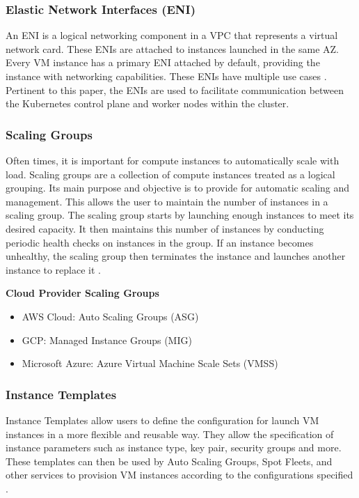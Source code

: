\subsubsection{Elastic Network Interfaces (ENI)}
An ENI is a logical networking component in a VPC that represents a virtual network card. These ENIs are attached to instances launched in the same AZ. Every VM instance has a primary ENI attached by default, providing the instance with networking capabilities. These ENIs have multiple use cases \cite{aws-no-dateE}. Pertinent to this paper, the ENIs are used to facilitate communication between the Kubernetes control plane and worker nodes within the cluster. 



\subsubsection{Scaling Groups}
Often times, it is important for compute instances to automatically scale with load. Scaling groups are a collection of compute instances treated as a logical grouping. Its main purpose and objective is to provide for automatic scaling and management. This allows the user to maintain the number of instances in a scaling group. The scaling group starts by launching enough instances to meet its desired capacity. It then maintains this number of instances by conducting periodic health checks on instances in the group. If an instance becomes unhealthy, the scaling group then terminates the instance and launches another instance to replace it \cite{aws-no-dateG}.  

\textbf{Cloud Provider Scaling Groups}
\begin{itemize}
    \vspace{-1em}
\item AWS Cloud: Auto Scaling Groups (ASG)
\item GCP: Managed Instance Groups (MIG)
\item Microsoft Azure: Azure Virtual Machine Scale Sets (VMSS)
\end{itemize}
\subsubsection {Instance Templates}

Instance Templates allow users to define the configuration for launch VM instances in a more flexible and reusable way. They allow the specification of instance parameters such as instance type, key pair, security groups and more. These templates can then be used by Auto Scaling Groups, Spot Fleets, and other services to provision VM instances according to the configurations specified \cite{gcp-no-date}. 

